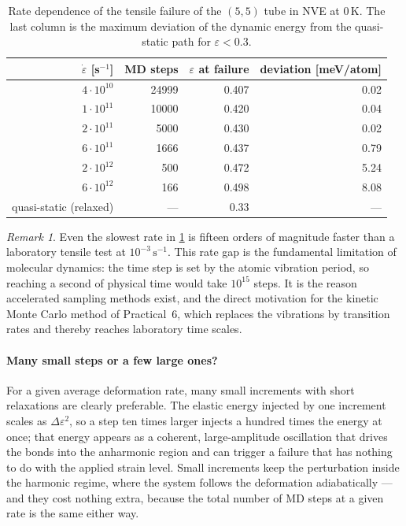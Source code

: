 \documentclass[11pt,a4paper]{article}
\numberwithin{equation}{section}
\theoremstyle{remark}
\newtheorem{remark}{Remark}[section]
\begin{document}
\begin{table}[ht]
  \centering
  \caption{Rate dependence of the tensile failure of the $(5,5)$ tube in NVE at 0\,K. The
    last column is the maximum deviation of the dynamic energy from the quasi-static path for
    $\varepsilon < 0.3$.}
  \label{tab:rates}
  \begin{tabular}{rrrr}
    \toprule
    $\dot\varepsilon$ [s$^{-1}$] & MD steps & $\varepsilon$ at failure & deviation [meV/atom] \\
    \midrule
    $4\cdot10^{10}$ & \num{24999} & 0.407 & 0.02 \\
    $1\cdot10^{11}$ & \num{10000} & 0.420 & 0.04 \\
    $2\cdot10^{11}$ & \num{5000}  & 0.430 & 0.02 \\
    $6\cdot10^{11}$ & \num{1666}  & 0.437 & 0.79 \\
    $2\cdot10^{12}$ & \num{500}   & 0.472 & 5.24 \\
    $6\cdot10^{12}$ & \num{166}   & 0.498 & 8.08 \\
    \midrule
    quasi-static (relaxed) & --- & 0.33 & --- \\
    \bottomrule
  \end{tabular}
\end{table}

\begin{remark}
  Even the slowest rate in \cref{tab:rates} is fifteen orders of magnitude faster than a laboratory
  tensile test at $10^{-3}\,\mathrm{s^{-1}}$. This rate gap is the fundamental limitation of molecular
  dynamics: the time step is set by the atomic vibration period, so reaching a second of physical time
  would take $10^{15}$ steps. It is the reason accelerated sampling methods exist, and the direct
  motivation for the kinetic Monte Carlo method of Practical~6, which replaces the vibrations by
  transition rates and thereby reaches laboratory time scales.
\end{remark}

\paragraph{Many small steps or a few large ones?}
For a given average deformation rate, many small increments with short relaxations are clearly
preferable. The elastic energy injected by one increment scales as $\Delta\varepsilon^2$, so a step ten
times larger injects a hundred times the energy at once; that energy appears as a coherent,
large-amplitude oscillation that drives the bonds into the anharmonic region and can trigger a failure
that has nothing to do with the applied strain level. Small increments keep the perturbation inside
the harmonic regime, where the system follows the deformation adiabatically --- and they cost nothing
extra, because the total number of MD steps at a given rate is the same either way.
\end{document}

